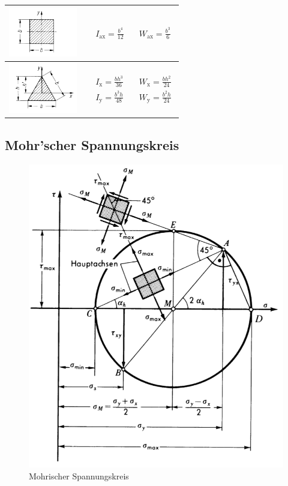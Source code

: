 \begin{table}[H]
\begin{tabularx}{\linewidth}{m{30mm}XX}
	\includegraphics[width=30mm]{festigkeitslehre/quadrat} & $\begin{aligned} & I_\text{ax} = \frac{b^4}{12} \end{aligned}$ & $\begin{aligned} W_\text{ax} = \frac{b^3}{6} \end{aligned}$ \\ \midrule
	\includegraphics[width=30mm]{festigkeitslehre/dreieck} & $\begin{aligned} & I_\text{x} = \frac{bh^3}{36} \\ &I_\text{y} = \frac{b^3h}{48} \end{aligned}$ & $\begin{aligned} W_\text{x} = \frac{bh^2}{24} \\ W_\text{y} = \frac{b^2h}{24}\end{aligned}$ \\\bottomrule
\end{tabularx}
\end{table}
\vfill
\pagebreak

\subsection{Mohr'scher Spannungskreis}
\begin{figure}[H]
	\centering
	\includegraphics[width=0.63\linewidth]{festigkeitslehre/mohrischer-spannungskreis}
	\caption*{Mohrischer Spannungskreis}
\end{figure}

